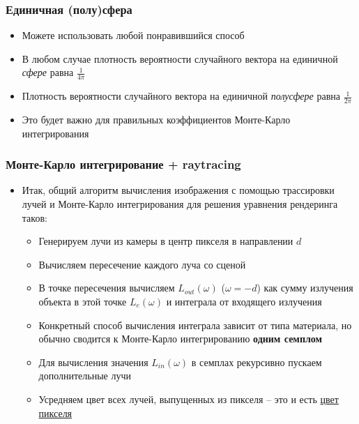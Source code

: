 \documentclass[handout,10pt]{beamer}
\begin{document}
\begin{frame}[fragile]
\frametitle{Единичная (полу)сфера}
\begin{itemize}
\item Можете использовать любой понравившийся способ
\pause
\item В любом случае плотность вероятности случайного вектора на единичной \textit{сфере} равна \begin{math}\frac{1}{4\pi}\end{math}
\pause
\item Плотность вероятности случайного вектора на единичной \textit{полусфере} равна \begin{math}\frac{1}{2\pi}\end{math}
\pause
\item Это будет важно для правильных коэффициентов Монте-Карло интегрирования
\end{itemize}
\end{frame}

\begin{frame}[fragile]
\frametitle{Монте-Карло интегрирование + raytracing}
\begin{itemize}
\item Итак, общий алгоритм вычисления изображения с помощью трассировки лучей и Монте-Карло интегрирования для решения уравнения рендеринга таков:
\pause
\begin{itemize}
\item Генерируем лучи из камеры в центр пикселя в направлении \begin{math}d\end{math}
\pause
\item Вычисляем пересечение каждого луча со сценой
\pause
\item В точке пересечения вычисляем \begin{math}L_{out}(\omega)\end{math} (\begin{math}\omega=-d\end{math}) как сумму излучения объекта в этой точке \begin{math}L_e(\omega)\end{math} и интеграла от входящего излучения
\pause
\item Конкретный способ вычисления интеграла зависит от типа материала, но обычно сводится к Монте-Карло интегрированию \textbf{одним семплом}
\pause
\item Для вычисления значения \begin{math}L_{in}(\omega)\end{math} в семплах рекурсивно пускаем дополнительные лучи
\pause
\item Усредняем цвет всех лучей, выпущенных из пикселя -- это и есть \underline{цвет пикселя}
\end{itemize}
\end{itemize}
\end{frame}
\end{document}
